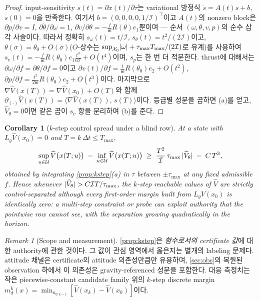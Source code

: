 \documentclass[11pt]{article}
\theoremstyle{plain}
\newtheorem{corollary}[theorem]{Corollary}
\theoremstyle{definition}
\theoremstyle{remark}
\newtheorem{remark}[theorem]{Remark}
\DeclarePairedDelimiter{\abs}{\lvert}{\rvert}
\newcommand{\inner}[2]{\langle #1,\,#2\rangle}
\newcommand{\calX}{\mathcal{X}}
\newcommand{\calU}{\mathcal{U}}
\newcommand{\Vhat}{\widehat V}
\newcommand{\mass}{\mathsf m}
\newcommand{\inertia}{\mathcal I}
\newcommand{\Lg}{L_g}
\newcommand{\grad}{\nabla}
\begin{document}
\begin{proof}
input-sensitivity $s(t)=\partial x(t)/\partial\tau$는 variational 방정식 $\dot s=A(t)s+b$,
$s(0)=0$을 만족한다. 여기서 $b=(0,0,0,0,1/\inertia)^\top$이고 $A(t)$의 nonzero block은
$\partial\dot p/\partial v=I$, $\partial\dot\theta/\partial\omega=1$,
$\partial\dot v/\partial\theta=-\tfrac{f}{\mass}R(\theta)e_1$뿐이며 --- 순서
$(\omega,\theta,v,p)$의 순수 삼각 사슬이다. 따라서 정확히 $s_\omega(t)=t/\inertia$,
$s_\theta(t)=t^2/(2\inertia)$이고, $\theta(\sigma)=\theta_0+O(\sigma)$($O$-상수는
$\sup_{\calX_0}\abs{\omega}+\tau_{\max}T_{\max}/(2\inertia)$로 유계)를 사용하여
$s_v(t)=-\tfrac{f}{\mass}R(\theta_0)e_1\tfrac{t^3}{6\inertia}+O(t^4)$이며, $s_p$는 한 번 더
적분한다. thrust에 대해서는 $\partial\omega/\partial f=\partial\theta/\partial f=0$이고
$\partial v(t)/\partial f=\tfrac{t}{\mass}R(\theta_0)e_2+O(t^2)$,
$\partial p/\partial f=\tfrac{t^2}{2\mass}R(\theta_0)e_2+O(t^3)$이다. 마지막으로
$\grad\Vhat(x(T))=\grad\Vhat(x_0)+O(T)$와 함께
$\partial_{(\cdot)}\Vhat(x(T))=\inner{\grad\Vhat(x(T))}{s(T)}$이다. 등급별 성분을 곱하면 (a)를
얻고, $\Vhat_\theta=0$이면 같은 곱이 $s_v$ 항을 분리하여 (b)를 준다.
\end{proof}

\begin{corollary}[$k$-step control spread under a blind row]\label{cor:kstep-spread}
At a state with $\Lg\Vhat(x_0)=0$ and $T=k\,\Delta t\le T_{\max}$,
\begin{equation}
\sup_{u\in\calU}\Vhat\big(x(T;u)\big)\;-\;\inf_{u\in\calU}\Vhat\big(x(T;u)\big)
\;\ge\; \frac{T^2}{\inertia}\,\tau_{\max}\,\abs{\Vhat_\theta}\;-\;C\,T^3 ,
\end{equation}
obtained by integrating \cref{prop:kstep}(a) in $\tau$ between $\pm\tau_{\max}$ at any fixed
admissible $f$. Hence whenever $\abs{\Vhat_\theta}>C\inertia T/\tau_{\max}$, the $k$-step
reachable values of $\Vhat$ are strictly control-separated although every first-order margin
built from $\Lg\Vhat(x_0)$ is identically zero: a multi-step constraint or probe can exploit
authority that the pointwise row cannot see, with the separation growing quadratically in the
horizon.
\end{corollary}

\begin{remark}[Scope and measurement]\label{rem:kstep-scope}
\cref{prop:kstep}은 \emph{함수로서의 certificate 값}에 대한 authority에 관한 것이다. 그 값이 관심
영역에서 옳은지는 별개의 labeling 문제다. attitude 채널은 certificate의 attitude 의존성만큼만
유용하며, \cref{sec:obs}의 복원된 observation 하에서 이 의존성은 gravity-referenced 성분을 포함한다.
대응 측정치는 작은 piecewise-constant candidate family 위의 $k$-step discrete margin
$m_d^k(x)=\min_{u_{0:k-1}}[\Vhat(x_k)-\Vhat(x_0)]$이다.
\end{remark}
\end{document}
